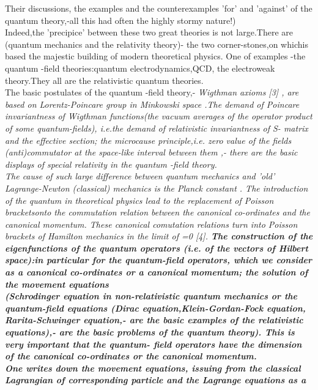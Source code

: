 \documentclass[a4paper,12pt] {article}
\begin{document}
 Their discussions, the examples and  the counterexamples 'for' and 'against' of
the quantum theory,-all this had often the highly  stormy nature!)
\\Indeed,the 'precipice' between these two great theories is not large.There are
 (quantum mechanics and the  relativity theory)- the two corner-stones,on whichis based the majestic building of  modern theoretical physics.
 One of examples -the quantum -field theories:quantum electrodynamics,QCD, the electroweak theory.They all are the relativistic quantum theories.
\\The basic postulates of the quantum -field theory,-  \it  Wigthman axioms \rm [3] , are based on
Lorentz-Poincare group in Minkowski space
.The demand of Poincare invariantness of \it Wigthman functions\rm (the vacuum averages of the operator product of some quantum-fields),
i.e.the  demand of relativistic invariantness of S- matrix and  the effective section; \it the microcause  principle\rm,i.e.  zero value of the fields (anti)commutator at the space-like interval between them ,-
there are the basic displays  of special relativity in the quantum -field theory.
\\The cause of such large difference between quantum mechanics and  'old'  Lagrange-Newton  (classical)
  mechanics is the Planck constant \myHighlight{$\hbar$}\coordHE{}. \rm The introduction of the quantum  \myHighlight{$\hbar$}\coordHE{}
in  theoretical physics  lead to the replacement of  \it Poisson brackets\rm onto  the \it commutation \rm relation between
 the canonical co-ordinates and the canonical momentum.
These \it canonical comutation relations \rm turn  into  Poisson brackets of Hamilton mechanics in the
 limit of  \myHighlight{$\hbar$}\coordHE{}=0
[4]. \bf The construction of the eigenfunctions of the quantum operators (i.e. of the vectors of Hilbert
space):in particular for the quantum-field operators, which we consider as a canonical  co-ordinates or a
 canonical momentum; the solution of the movement equations \\(Schrodinger equation in non-relativistic
 quantum mechanics or the quantum-field equations (Dirac equation,Klein-Gordan-Fock equation,
Rarita-Schwinger equation,- are the basic examples of the relativistic equations),- are the basic problems
of the quantum theory)\rm  . This is very important that the quantum- field operators have the dimension
of the canonical co-ordinates or the canonical momentum.\\ One writes  down the movement equations,
issuing from the classical Lagrangian of corresponding particle and the Lagrange equations as a
\end{document}
